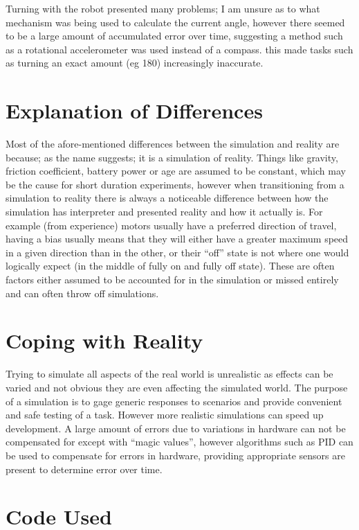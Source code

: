 \documentclass[10pt]{article}
\begin{document}
        Turning with the robot presented many problems; I am unsure as to what mechanism was being used to calculate the current angle, however there seemed to be a large amount of accumulated error over time, suggesting a method such as a rotational accelerometer was used instead of a compass. this made tasks such as turning an exact amount (eg 180\textdegree) increasingly inaccurate.

    \section{Explanation of Differences}
        Most of the afore-mentioned differences between the simulation and reality are because; as the name suggests; it is a simulation of reality. Things like gravity, friction coefficient, battery power or age are assumed to be constant, which may be the cause for short duration experiments, however when transitioning from a simulation to reality there is always a noticeable difference between how the simulation has interpreter and presented reality and how it actually is. For example (from experience) motors usually have a preferred direction of travel, having a bias usually means that they will either have a greater maximum speed in a given direction than in the other, or their ``off'' state is not where one would logically expect (in the middle of fully on and fully off state). These are often factors either assumed to be accounted for in the simulation or missed entirely and can often throw off simulations.

    \section{Coping with Reality}
        Trying to simulate all aspects of the real world is unrealistic as effects can be varied and not obvious they are even affecting the simulated world. The purpose of a simulation is to gage generic responses to scenarios and provide convenient and safe testing of a task. However more realistic simulations can speed up development. A large amount of errors due to variations in hardware can not be compensated for except with ``magic values'', however algorithms such as PID can be used to compensate for errors in hardware, providing appropriate sensors are present to determine error over time. 

    \newpage
    \section{Code Used}
        
        \newpage
        
        \newpage
        
\end{document}

